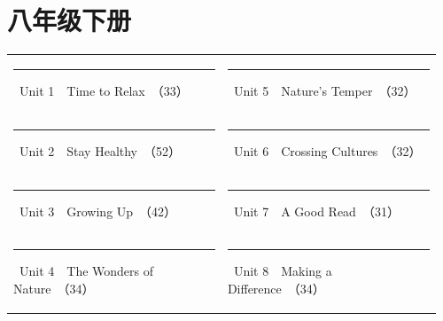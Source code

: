 \documentclass[UTF8,a4paper,11pt,oneside]{ctexbook}
\begin{document}
\chapter{八年级下册}
\par\noindent{\color{volcolor}\rule{\linewidth}{2.6pt}}\par
\vspace{0.3em}
\par
\vspace{1.0em}
\par
\vspace{0.35em}
\noindent\begin{tabular}{@{}p{0.48\linewidth}p{0.48\linewidth}@{}}
{\color{volcolor}\rule[0.3ex]{0.85ex}{0.85ex}}~Unit 1　Time to Relax~{\footnotesize\color{textgray!80}（33）} & {\color{volcolor}\rule[0.3ex]{0.85ex}{0.85ex}}~Unit 5　Nature's Temper~{\footnotesize\color{textgray!80}（32）} \\
{\color{volcolor}\rule[0.3ex]{0.85ex}{0.85ex}}~Unit 2　Stay Healthy~{\footnotesize\color{textgray!80}（52）} & {\color{volcolor}\rule[0.3ex]{0.85ex}{0.85ex}}~Unit 6　Crossing Cultures~{\footnotesize\color{textgray!80}（32）} \\
{\color{volcolor}\rule[0.3ex]{0.85ex}{0.85ex}}~Unit 3　Growing Up~{\footnotesize\color{textgray!80}（42）} & {\color{volcolor}\rule[0.3ex]{0.85ex}{0.85ex}}~Unit 7　A Good Read~{\footnotesize\color{textgray!80}（31）} \\
{\color{volcolor}\rule[0.3ex]{0.85ex}{0.85ex}}~Unit 4　The Wonders of Nature~{\footnotesize\color{textgray!80}（34）} & {\color{volcolor}\rule[0.3ex]{0.85ex}{0.85ex}}~Unit 8　Making a Difference~{\footnotesize\color{textgray!80}（34）} \\
\end{tabular}
\vspace{1.3em}
\end{document}
